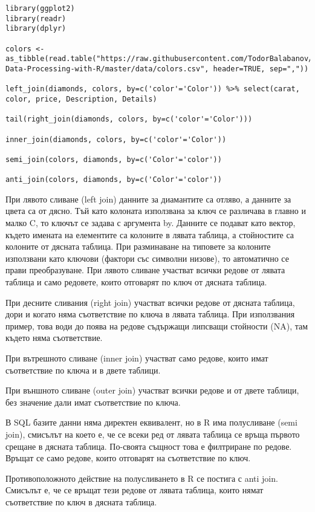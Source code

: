 \begin{lstlisting}[caption=Сложни сливания, label=listing0141]
library(ggplot2)
library(readr)
library(dplyr)

colors <- as_tibble(read.table("https://raw.githubusercontent.com/TodorBalabanov/Statistical-Data-Processing-with-R/master/data/colors.csv", header=TRUE, sep=","))

left_join(diamonds, colors, by=c('color'='Color')) %>% select(carat, color, price, Description, Details)

tail(right_join(diamonds, colors, by=c('color'='Color')))

inner_join(diamonds, colors, by=c('color'='Color'))

semi_join(colors, diamonds, by=c('Color'='color'))

anti_join(colors, diamonds, by=c('Color'='color'))
\end{lstlisting}

При лявото сливане (left join) данните за диамантите са отляво, а данните за цвета са от дясно. Тъй като колоната използвана за ключ се различава в главно и малко C, то ключът се задава с аргумента by. Данните се подават като вектор, където имената на елементите са колоните в лявата таблица, а стойностите са колоните от дясната таблица. При разминаване на типовете за колоните използвани като ключови (фактори със символни низове), то автоматично се прави преобразуване. При лявото сливане участват всички редове от лявата таблица и само редовете, които отговарят по ключ от дясната таблица. 

При десните сливания (right join) участват всички редове от дясната таблица, дори и когато няма съответствие по ключа в лявата таблица. При използвания пример, това води до поява на редове съдържащи липсващи стойности (NA), там където няма съответствие.

При вътрешното сливане (inner join) участват само редове, които имат съответствие по ключа и в двете таблици. 

При външното сливане (outer join) участват всички редове и от двете таблици, без значение дали имат съответствие по ключа.

В SQL базите данни няма директен еквивалент, но в R има полусливане (semi join), смисълът на което е, че се всеки ред от лявата таблица се връща първото срещане в дясната таблица. По-своята същност това е филтриране по редове. Връщат се само редове, които отговарят на съответствие по ключ. 

Противоположното действие на полусливането в R се постига с anti join. Смисълът е, че се връщат тези редове от лявата таблица, които нямат съответствие по ключ в дясната таблица. 

